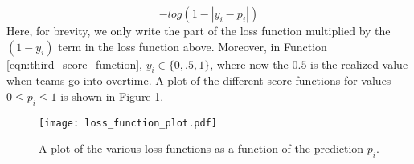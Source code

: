 \begin{equation}\label{eqn:third_score_function}
-log(1-|y_i-p_i|)
\end{equation} 
Here, for brevity, we only write the part of the loss function multiplied by the $(1-y_i)$ term in the loss function above. Moreover, in Function \ref{eqn:third_score_function}, $y_i \in \{0,.5,1\}$, where now the $0.5$ is the realized value when teams go into overtime. A plot of the different score functions for values $0\leq p_i \leq 1$ is shown in Figure \ref{fig:scoring_functions}.  

\begin{figure}[h]
\centering
\texttt{[image: loss\_function\_plot.pdf]}
\caption{A plot of the various loss functions as a function of the prediction $p_i$.  }
\label{fig:scoring_functions}
\end{figure}

